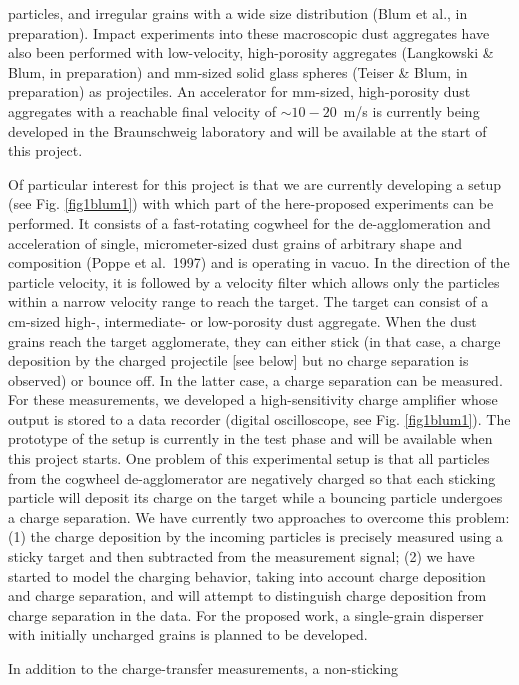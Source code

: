 particles, and irregular grains with a wide size distribution
(Blum et al., in preparation). Impact experiments into these
macroscopic dust aggregates have also been performed with
low-velocity, high-porosity aggregates (Langkowski \& Blum, in
preparation) and mm-sized solid glass spheres (Teiser \& Blum, in
preparation) as projectiles. An accelerator for mm-sized,
high-porosity dust aggregates with a reachable final velocity of
$\sim 10-20$~m/s is currently being developed in the Braunschweig
laboratory and will be available at the start of this project.
\par
Of particular interest for this project is that we are currently
developing a setup (see Fig. \ref{fig1blum1}) with which part of
the here-proposed experiments can be performed. It consists of a
fast-rotating cogwheel for the de-agglomeration and acceleration of
single, micrometer-sized dust grains of arbitrary shape and
composition (Poppe et al.~1997) and is operating in vacuo. In the
direction of the particle velocity, it is followed by a velocity
filter which allows only the particles within a narrow velocity
range to reach the target. The target can consist of a cm-sized
high-, intermediate- or low-porosity dust aggregate. When the dust
grains reach the target agglomerate, they can either stick (in
that case, a charge deposition by the charged projectile [see
below] but no charge separation is observed) or bounce off. In the
latter case, a charge separation can be measured. For these
measurements, we developed a high-sensitivity charge amplifier
whose output is stored to a data recorder (digital oscilloscope,
see Fig. \ref{fig1blum1}). The prototype of the setup is currently
in the test phase and will be available when this project starts.
One problem of this experimental setup is that all particles from
the cogwheel de-agglomerator are negatively charged so that each
sticking particle will deposit its charge on the target while a
bouncing particle undergoes a charge separation. We have currently
two approaches to overcome this problem: (1) the charge deposition
by the incoming particles is precisely measured using a sticky
target and then subtracted from the measurement signal; (2) we
have started to model the charging behavior, taking into account
charge deposition and charge separation, and will attempt to
distinguish charge deposition from charge separation in the data.
For the proposed work, a single-grain disperser with initially
uncharged grains is planned to be developed.
\par
In addition to the charge-transfer measurements, a non-sticking
